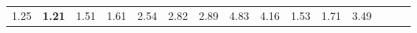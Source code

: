 \begin{tabular}{ll|rrrrrrrrr|rrrr}
  


  
  1.25 & \textbf{1.21} & 1.51 & 1.61 & 2.54 & 2.82 & 2.89 & 4.83 & 4.16 & 1.53 & 1.71 & 3.49 &  \\


\end{tabular}
